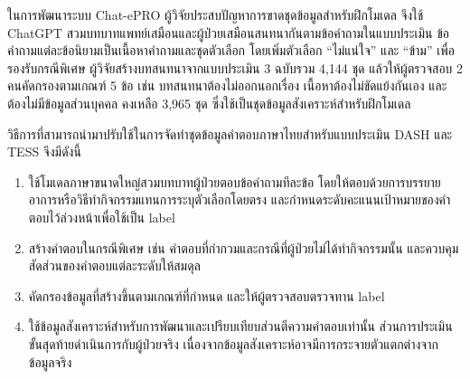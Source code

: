 ในการพัฒนาระบบ Chat-ePRO \citep{Chen2024} ผู้วิจัยประสบปัญหาการขาดชุดข้อมูลสำหรับฝึกโมเดล จึงใช้ ChatGPT สวมบทบาทแพทย์เสมือนและผู้ป่วยเสมือนสนทนากันตามข้อคำถามในแบบประเมิน ข้อคำถามแต่ละข้อนิยามเป็นเนื้อหาคำถามและชุดตัวเลือก โดยเพิ่มตัวเลือก ``ไม่แน่ใจ'' และ ``ข้าม'' เพื่อรองรับกรณีพิเศษ ผู้วิจัยสร้างบทสนทนาจากแบบประเมิน 3 ฉบับรวม 4,144 ชุด แล้วให้ผู้ตรวจสอบ 2 คนคัดกรองตามเกณฑ์ 5 ข้อ เช่น บทสนทนาต้องไม่ออกนอกเรื่อง เนื้อหาต้องไม่ขัดแย้งกันเอง และต้องไม่มีข้อมูลส่วนบุคคล คงเหลือ 3,965 ชุด ซึ่งใช้เป็นชุดข้อมูลสังเคราะห์สำหรับฝึกโมเดล

วิธีการที่สามารถนำมาปรับใช้ในการจัดทำชุดข้อมูลคำตอบภาษาไทยสำหรับแบบประเมิน DASH และ TESS จึงมีดังนี้
\begin{enumerate}
    \item ใช้โมเดลภาษาขนาดใหญ่สวมบทบาทผู้ป่วยตอบข้อคำถามทีละข้อ โดยให้ตอบด้วยการบรรยายอาการหรือวิธีทำกิจกรรมแทนการระบุตัวเลือกโดยตรง และกำหนดระดับคะแนนเป้าหมายของคำตอบไว้ล่วงหน้าเพื่อใช้เป็น label
    \item สร้างคำตอบในกรณีพิเศษ เช่น คำตอบที่กำกวมและกรณีที่ผู้ป่วยไม่ได้ทำกิจกรรมนั้น และควบคุมสัดส่วนของคำตอบแต่ละระดับให้สมดุล
    \item คัดกรองข้อมูลที่สร้างขึ้นตามเกณฑ์ที่กำหนด และให้ผู้ตรวจสอบตรวจทาน label
    \item ใช้ข้อมูลสังเคราะห์สำหรับการพัฒนาและเปรียบเทียบส่วนตีความคำตอบเท่านั้น ส่วนการประเมินขั้นสุดท้ายดำเนินการกับผู้ป่วยจริง เนื่องจากข้อมูลสังเคราะห์อาจมีการกระจายตัวแตกต่างจากข้อมูลจริง
\end{enumerate}

